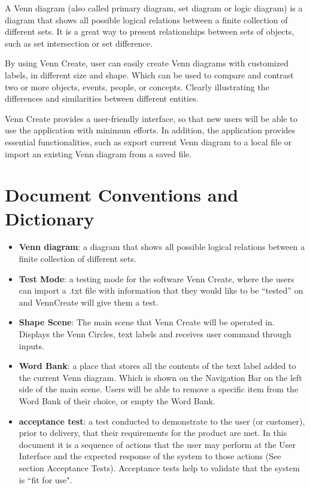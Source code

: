 \documentclass[fontsize=12pt,paper=letter,twoside]{scrartcl}
\begin{document}
A Venn diagram (also called primary diagram, set diagram or logic diagram) is a diagram that shows all possible logical relations between a finite
collection of different sets. It is a great way to present relationships
between sets of objects, such as set intersection or set difference.

By using Venn Create, user can easily create Venn diagrams with customized
labels, in different size and shape. Which can be used to compare and
contrast two or more objects, events, people, or concepts. Clearly
illustrating the differences and similarities between different entities.

Venn Create provides a user-friendly interface, so that new users will
be able to use the application with minimum efforts. In addition,
the application provides essential functionalities, such as export current Venn diagram to a local file or import an existing Venn diagram from a saved file.
 

\newpage
\section{Document Conventions and Dictionary}

\begin{itemize}
	\item \textbf{Venn diagram}: a diagram that shows all possible logical relations between a finite collection of different sets.
	\item \textbf{Test Mode}: a testing mode for the software Venn Create, where the users can import a .txt file with information that they would like to be “tested” on and VennCreate will give them a test.
	\item \textbf{Shape Scene}: The main scene that Venn Create will be operated in. Displays the Venn Circles, text labels and receives user command through inputs.  
	\item \textbf{Word Bank}: a place that stores all the contents of the text label added to the current Venn diagram. Which is shown on the Navigation Bar on the left side of the main scene. Users will be able to remove a specific item from the Word Bank of their choice, or empty the Word Bank.
	\item \textbf{acceptance test}: a test conducted to demonstrate to the user (or customer), prior to delivery, that their requirements for the product are met. In this document it is a sequence of actions that the user may perform at the User Interface and the expected response of the system to those actions (See section Acceptance Tests). Acceptance tests help to validate that the system is ``fit for use".
\end{itemize}
\end{document}
